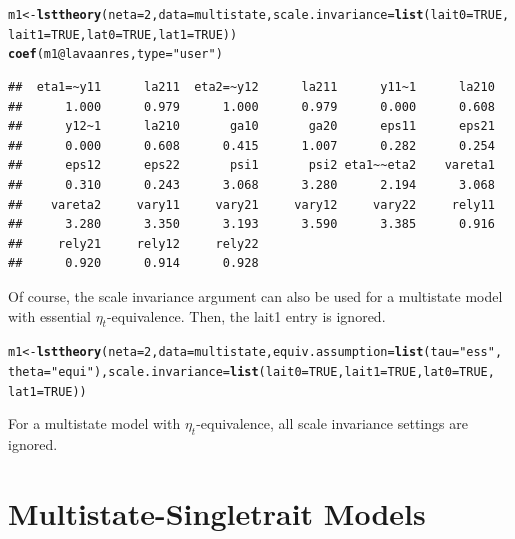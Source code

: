 \documentclass[10pt]{article}\usepackage{graphicx, color}
\makeatletter
\newcommand{\hlfunctioncall}[1]{\textcolor[rgb]{0.501960784313725,0,0.329411764705882}{\textbf{#1}}}%
\newcommand{\hlstring}[1]{\textcolor[rgb]{0.6,0.6,1}{#1}}%
\newenvironment{kframe}{%
 \def\at@end@of@kframe{}%
 \ifinner\ifhmode%
  \def\at@end@of@kframe{\end{minipage}}%
  \begin{minipage}{\columnwidth}%
 \fi\fi%
 \def\FrameCommand##1{\hskip\@totalleftmargin \hskip-\fboxsep
 \colorbox{shadecolor}{##1}\hskip-\fboxsep
     \hskip-\linewidth \hskip-\@totalleftmargin \hskip\columnwidth}%
 \MakeFramed {\advance\hsize-\width
   \@totalleftmargin\z@ \linewidth\hsize
   \@setminipage}}%
 {\par\unskip\endMakeFramed%
 \at@end@of@kframe}
\newenvironment{knitrout}{}{} %
\makeatother
\begin{document}
%
\begin{knitrout}
\color{fgcolor}\begin{kframe}
\begin{alltt}
m1 <- \hlfunctioncall{lsttheory}(neta = 2, data = multistate, scale.invariance = \hlfunctioncall{list}(lait0 = TRUE, 
    lait1 = TRUE, lat0 = TRUE, lat1 = TRUE))
\hlfunctioncall{coef}(m1@lavaanres, type = \hlstring{"user"})
\end{alltt}
\begin{verbatim}
##  eta1=~y11      la211  eta2=~y12      la211      y11~1      la210 
##      1.000      0.979      1.000      0.979      0.000      0.608 
##      y12~1      la210       ga10       ga20      eps11      eps21 
##      0.000      0.608      0.415      1.007      0.282      0.254 
##      eps12      eps22       psi1       psi2 eta1~~eta2    vareta1 
##      0.310      0.243      3.068      3.280      2.194      3.068 
##    vareta2     vary11     vary21     vary12     vary22     rely11 
##      3.280      3.350      3.193      3.590      3.385      0.916 
##     rely21     rely12     rely22 
##      0.920      0.914      0.928
\end{verbatim}
\end{kframe}
\end{knitrout}

%
Of course, the scale invariance argument can also be used for a multistate model with essential $\eta_t$-equivalence. Then, the lait1 entry is ignored.
%
\begin{knitrout}
\color{fgcolor}\begin{kframe}
\begin{alltt}
m1 <- \hlfunctioncall{lsttheory}(neta = 2, data = multistate, equiv.assumption = \hlfunctioncall{list}(tau = \hlstring{"ess"}, 
    theta = \hlstring{"equi"}), scale.invariance = \hlfunctioncall{list}(lait0 = TRUE, lait1 = TRUE, lat0 = TRUE, 
    lat1 = TRUE))
\end{alltt}
\end{kframe}
\end{knitrout}

%
For a multistate model with $\eta_t$-equivalence, all scale invariance settings are ignored.


\newpage
\section{Multistate-Singletrait Models}
\end{document}
